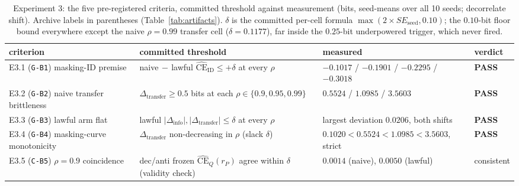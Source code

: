 \documentclass[twocolumn,10pt]{article}
\theoremstyle{definition}
\theoremstyle{remark}
\newcommand{\CE}{\mathrm{CE}}
\newcommand{\rP}{r_{P}}
\newcommand{\CEhat}{\widehat{\CE}}
\begin{document}
\begin{table}[t]
\centering
\caption{Experiment 3: the five pre-registered criteria, committed
threshold against measurement (bits, seed-means over all 10 seeds;
decorrelate shift). Archive labels in parentheses
(Table~\ref{tab:artifacts}). $\delta$ is the committed per-cell formula
$\max(2 \times SE_{\mathrm{seed}}, 0.10)$; the $0.10$-bit floor bound
everywhere except the naive $\rho = 0.99$ transfer cell
($\delta = 0.1177$), far inside the $0.25$-bit underpowered trigger,
which never fired.}
\label{tab:e3-gates}
\footnotesize
\setlength{\tabcolsep}{4.0pt}
\begin{tabular}{@{}p{3.55cm}p{5.55cm}p{4.85cm}l@{}}
\toprule
criterion & committed threshold & measured & verdict \\
\midrule
E3.1 (\texttt{G-B1}) masking-ID premise &
naive$\,-\,$lawful $\CEhat_{\mathrm{ID}} \le +\delta$ at every $\rho$ &
$-0.1017$ / $-0.1901$ / $-0.2295$ / $-0.3018$ & \textbf{PASS} \\
E3.2 (\texttt{G-B2}) naive transfer brittleness &
$\Delta_{\mathrm{transfer}} \ge 0.5$ bits at each
$\rho \in \{0.9, 0.95, 0.99\}$ &
$0.5524$ / $1.0985$ / $3.5603$ & \textbf{PASS} \\
E3.3 (\texttt{G-B3}) lawful arm flat &
lawful $|\Delta_{\mathrm{info}}|, |\Delta_{\mathrm{transfer}}| \le \delta$
at every $\rho$ & largest deviation $0.0206$, both shifts & \textbf{PASS} \\
E3.4 (\texttt{G-B4}) masking-curve monotonicity &
$\Delta_{\mathrm{transfer}}$ non-decreasing in $\rho$ (slack $\delta$) &
$0.1020 < 0.5524 < 1.0985 < 3.5603$, strict & \textbf{PASS} \\
E3.5 (\texttt{C-B5}) $\rho = 0.9$ coincidence &
dec/anti frozen $\CEhat_Q(\rP)$ agree within $\delta$ (validity check) &
$0.0014$ (naive), $0.0050$ (lawful) & consistent \\
\bottomrule
\end{tabular}
\end{table}
\end{document}

